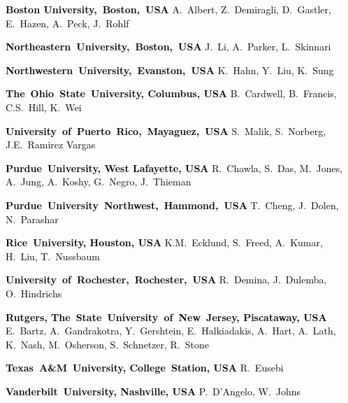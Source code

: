 \textcolor{black}{\textbf{Boston University,~Boston,~USA}\newline
A.~Albert, Z.~Demiragli, D.~Gastler, E.~Hazen, A.~Peck, J.~Rohlf}

\textcolor{black}{\textbf{Northeastern~University,~Boston,~USA}\newline
J.~Li, A.~Parker, L.~Skinnari}

\textcolor{black}{\textbf{Northwestern~University,~Evanston,~USA}\newline
K.~Hahn, Y.~Liu, K.~Sung}

\textcolor{black}{\textbf{The~Ohio~State~University, Columbus, USA}\newline
B.~Cardwell, B.~Francis, C.S.~Hill, K.~Wei}

\textcolor{black}{\textbf{University~of~Puerto~Rico,~Mayaguez,~USA}\newline
S.~Malik, S.~Norberg, J.E.~Ramirez Vargas}

\textcolor{black}{\textbf{Purdue~University, West Lafayette, USA}\newline
R.~Chawla, S.~Das, M.~Jones, A.~Jung, A.~Koshy, G.~Negro, J.~Thieman}

\textcolor{black}{\textbf{Purdue~University~Northwest,~Hammond,~USA}\newline
T.~Cheng, J.~Dolen, N.~Parashar}

\textcolor{black}{\textbf{Rice~University, Houston, USA}\newline
K.M.~Ecklund, S.~Freed, A.~Kumar, H.~Liu, T.~Nussbaum}

\textcolor{black}{\textbf{University~of~Rochester,~Rochester,~USA}\newline
R.~Demina, J.~Dulemba, O.~Hindrichs}

\textcolor{black}{\textbf{Rutgers, The~State~University~of~New~Jersey, Piscataway, USA}\newline
E.~Bartz, A.~Gandrakotra, Y.~Gershtein, E.~Halkiadakis, A.~Hart, A.~Lath, K.~Nash, M.~Osherson, S.~Schnetzer, R.~Stone}

\textcolor{black}{\textbf{Texas~A\&M~University, College~Station, USA}\newline
R.~Eusebi}

\textcolor{black}{\textbf{Vanderbilt~University, Nashville, USA}\newline
P.~D'Angelo, W.~Johns}

